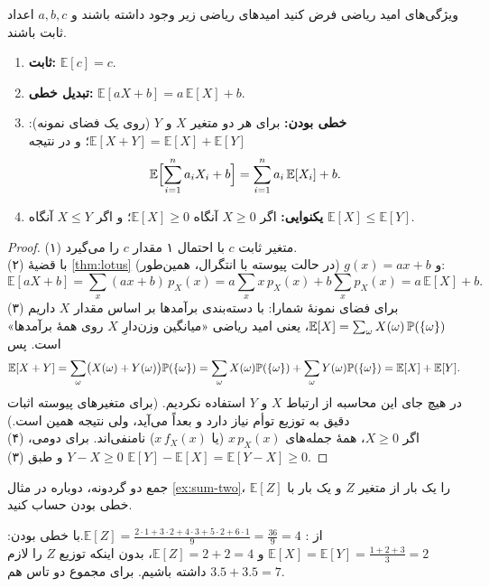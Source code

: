 \begin{theorem}[label=thm:expect-props]{ویژگی‌های امید ریاضی}
  فرض کنید امیدهای ریاضی زیر وجود داشته باشند و $a,b,c$ اعداد ثابت باشند.
  \begin{enumerate}
    \item \textbf{ثابت:} $\mathbb E[c]=c$.
    \item \textbf{تبدیل خطی:} $\mathbb E[aX+b]=a\,\mathbb E[X]+b$.
    \item \textbf{خطی بودن:} برای هر دو متغیر $X$ و $Y$ (روی یک فضای نمونه): $\mathbb E[X+Y]=\mathbb E[X]+\mathbb E[Y]$؛ و در نتیجه
          \[ \mathbb E\Bigl[\sum_{i=1}^na_iX_i+b\Bigr]=\sum_{i=1}^na_i\,\mathbb E[X_i]+b. \]
    \item \textbf{یکنوایی:} اگر $X\ge0$ آنگاه $\mathbb E[X]\ge0$؛ و اگر $X\le Y$ آنگاه $\mathbb E[X]\le\mathbb E[Y]$.
  \end{enumerate}
\end{theorem}

\begin{proof}
  \newline (۱) متغیر ثابت $c$ با احتمال ۱ مقدار $c$ را می‌گیرد.\\
  (۲) با قضیهٔ \ref{thm:lotus} و $g(x)=ax+b$ (در حالت پیوسته با انتگرال، همین‌طور):
  \[ \mathbb E[aX+b]=\sum_x(ax+b)\,p_X(x)=a\sum_xx\,p_X(x)+b\sum_xp_X(x)=a\,\mathbb E[X]+b. \]
  (۳) برای فضای نمونهٔ شمارا: با دسته‌بندی برآمدها بر اساس مقدار $X$ داریم $\mathbb E[X]=\sum_{\omega}X(\omega)\,\P(\{\omega\})$، یعنی امید ریاضی «میانگین وزن‌دارِ $X$ روی همهٔ برآمدها» است. پس
  \[ \mathbb E[X+Y]=\sum_\omega\bigl(X(\omega)+Y(\omega)\bigr)\P(\{\omega\})=\sum_\omega X(\omega)\P(\{\omega\})+\sum_\omega Y(\omega)\P(\{\omega\})=\mathbb E[X]+\mathbb E[Y]. \]
  در هیچ جای این محاسبه از ارتباط $X$ و $Y$ استفاده نکردیم. (برای متغیرهای پیوسته اثبات دقیق به توزیع توأم نیاز دارد و بعداً می‌آید، ولی نتیجه همین است.)\\
  (۴) اگر $X\ge0$، همهٔ جمله‌های $x\,p_X(x)$ (یا $x\,f_X(x)$) نامنفی‌اند. برای دومی، $Y-X\ge0$ و طبق (۳) \newline $\mathbb E[Y]-\mathbb E[X]=\mathbb E[Y-X]\ge0$.
\end{proof}

\begin{example}[label=ex:sum-two-mean]{جمع دو گردونه، دوباره}
  در مثال \ref{ex:sum-two}، $\mathbb E[Z]$ را یک بار از  متغیر $Z$ و یک بار با خطی بودن حساب کنید.
  \begin{solution}
    از : $\mathbb E[Z]=\frac{2\cdot1+3\cdot2+4\cdot3+5\cdot2+6\cdot1}{9}=\frac{36}{9}=4$.\newline با خطی بودن: $\mathbb E[X]=\mathbb E[Y]=\frac{1+2+3}{3}=2$ و $\mathbb E[Z]=2+2=4$، بدون اینکه توزیع $Z$ را لازم داشته باشیم. برای مجموع دو تاس هم $3.5+3.5=7$.
  \end{solution}
\end{example}

